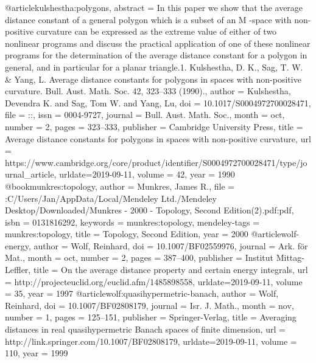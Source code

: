 @article{kulshestha:polygons,
abstract = {In this paper we show that the average distance constant of a general polygon which is a subset of an M -space with non-positive curvature can be expressed as the extreme value of either of two nonlinear programs and discuss the practical application of one of these nonlinear programs for the determination of the average distance constant for a polygon in general, and in particular for a planar triangle.1. Kulshestha, D. K., Sag, T. W. & Yang, L. Average distance constants for polygons in spaces with non-positive curvature. Bull. Aust. Math. Soc. 42, 323–333 (1990).},
author = {Kulshestha, Devendra K. and Sag, Tom W. and Yang, Lu},
doi = {10.1017/S0004972700028471},
file = {::},
issn = {0004-9727},
journal = {Bull. Aust. Math. Soc.},
month = {oct},
number = {2},
pages = {323--333},
publisher = {Cambridge University Press},
title = {{Average distance constants for polygons in spaces with non-positive curvature}},
url = {https://www.cambridge.org/core/product/identifier/S0004972700028471/type/journal_article},
urldate={2019-09-11},
volume = {42},
year = {1990}
}
@book{munkres:topology,
author = {Munkres, James R.},
file = {:C\:/Users/Jan/AppData/Local/Mendeley Ltd./Mendeley Desktop/Downloaded/Munkres - 2000 - Topology, Second Edition(2).pdf:pdf},
isbn = {0131816292},
keywords = {munkres:topology},
mendeley-tags = {munkres:topology},
title = {{Topology, Second Edition}},
year = {2000}
}
@article{wolf-energy,
author = {Wolf, Reinhard},
doi = {10.1007/BF02559976},
journal = {Ark. f{\"{o}}r Mat.},
month = {oct},
number = {2},
pages = {387--400},
publisher = {Institut Mittag-Leffler},
title = {{On the average distance property and certain energy integrals}},
url = {http://projecteuclid.org/euclid.afm/1485898558},
urldate={2019-09-11},
volume = {35},
year = {1997}
}
@article{wolf:quasihypermetric-banach,
author = {Wolf, Reinhard},
doi = {10.1007/BF02808179},
journal = {Isr. J. Math.},
month = {nov},
number = {1},
pages = {125--151},
publisher = {Springer-Verlag},
title = {{Averaging distances in real quasihypermetric Banach spaces of finite dimension}},
url = {http://link.springer.com/10.1007/BF02808179},
urldate={2019-09-11},
volume = {110},
year = {1999}
}
